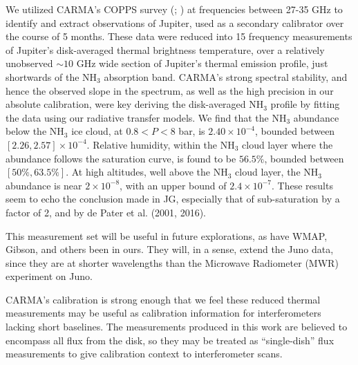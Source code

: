 \documentclass{article}
\newcommand{\e}[1]{\times 10^{#1}}
\begin{document}
	We utilized CARMA's COPPS survey (\citealt{2015ApJ...814..140K}; \citealt{2016ApJ...830...34K}) at frequencies between 27-35 GHz to identify and extract observations of Jupiter, used as a secondary calibrator over the course of 5 months. These data were reduced into 15 frequency measurements of Jupiter's disk-averaged thermal brightness temperature, over a relatively unobserved $\sim 10$ GHz wide section of Jupiter's thermal emission profile, just shortwards of the NH$_{3}$ absorption band.
	CARMA's strong spectral stability, and hence the observed slope in the spectrum, as well as the high precision in our absolute calibration, were key deriving the disk-averaged NH$_{3}$ profile by fitting the data using our radiative transfer models.
    We find that the NH$_{3}$ abundance below the NH$_{3}$ ice cloud, at $0.8 < P < 8$ bar,  is $2.40\e{-4}$, bounded between $[2.26, 2.57] \e{-4}$.
	Relative humidity, within the NH$_{3}$ cloud layer where the abundance follows the saturation curve, is found to be $56.5\%$, bounded between $[50\%, 63.5\%]$.
	At high altitudes, well above the NH$_{3}$ cloud layer, the NH$_{3}$  abundance is near $2\e{-8}$, with  an upper bound of $2.4\e{-7}$.
	These results seem to echo the conclusion made in JG, especially that of sub-saturation by a factor of 2, and by de Pater et al. (2001, 2016).

	This measurement set will be useful in future explorations, as have WMAP, Gibson, and others been in ours. They will, in a sense, extend the Juno data, since they are at shorter wavelengths than the Microwave Radiometer (MWR) experiment on Juno.
	

	CARMA's calibration is strong enough that we feel these reduced thermal measurements may be useful as calibration information for interferometers lacking short baselines.
	The measurements produced in this work are believed to encompass all flux from the disk, so they may be treated as ``single-dish'' flux measurements to give calibration context to interferometer scans.


\nocite{*}


\end{document}
